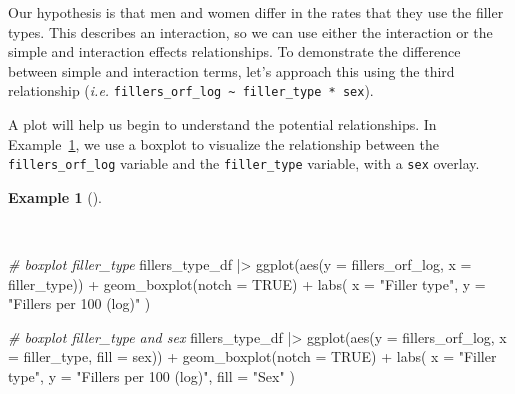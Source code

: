 \documentclass[
  letterpaper,
  krantz1]{latex/krantz-mod}
\newenvironment{Shaded}{\begin{snugshade}}{\end{snugshade}}
\newcommand{\AttributeTok}[1]{\textcolor[rgb]{0.00,0.00,0.00}{#1}}
\newcommand{\CommentTok}[1]{\textcolor[rgb]{0.00,0.00,0.00}{\textit{#1}}}
\newcommand{\ConstantTok}[1]{\textcolor[rgb]{0.00,0.00,0.00}{#1}}
\newcommand{\FunctionTok}[1]{\textcolor[rgb]{0.00,0.00,0.00}{#1}}
\newcommand{\NormalTok}[1]{\textcolor[rgb]{0.00,0.00,0.00}{#1}}
\newcommand{\SpecialCharTok}[1]{\textcolor[rgb]{0.00,0.00,0.00}{#1}}
\newcommand{\StringTok}[1]{\textcolor[rgb]{0.00,0.00,0.00}{#1}}
\theoremstyle{definition}
\theoremstyle{definition}
\newtheorem{example}{Example}[chapter]
\theoremstyle{remark}
\begin{document}
Our hypothesis is that men and women differ in the
rates that they use the filler types. This describes an
interaction, so we can use either the
interaction or the simple and interaction effects relationships. To
demonstrate the difference between simple and interaction terms, let's
approach this using the third relationship (\emph{i.e.}
\texttt{fillers\_orf\_log\ \textasciitilde{}\ filler\_type\ *\ sex}).

A plot will help us begin to understand the potential relationships. In
Example~\ref{exm-infer-multi-sex-plot}, we use a boxplot
to visualize the relationship between the \texttt{fillers\_orf\_log}
variable and the \texttt{filler\_type} variable, with a \texttt{sex}
overlay.

\begin{example}[]\protect\hypertarget{exm-infer-multi-sex-plot}{}\label{exm-infer-multi-sex-plot}

~

\begin{Shaded}
\begin{Highlighting}[numbers=left,,]
\CommentTok{\# boxplot \textasciigrave{}filler\_type\textasciigrave{}}
\NormalTok{fillers\_type\_df }\SpecialCharTok{|\textgreater{}}
  \FunctionTok{ggplot}\NormalTok{(}\FunctionTok{aes}\NormalTok{(}\AttributeTok{y =}\NormalTok{ fillers\_orf\_log, }\AttributeTok{x =}\NormalTok{ filler\_type)) }\SpecialCharTok{+}
  \FunctionTok{geom\_boxplot}\NormalTok{(}\AttributeTok{notch =} \ConstantTok{TRUE}\NormalTok{) }\SpecialCharTok{+}
  \FunctionTok{labs}\NormalTok{(}
    \AttributeTok{x =} \StringTok{"Filler type"}\NormalTok{,}
    \AttributeTok{y =} \StringTok{"Fillers per 100 (log)"}
\NormalTok{  )}

\CommentTok{\# boxplot \textasciigrave{}filler\_type\textasciigrave{} and \textasciigrave{}sex\textasciigrave{}}
\NormalTok{fillers\_type\_df }\SpecialCharTok{|\textgreater{}}
  \FunctionTok{ggplot}\NormalTok{(}\FunctionTok{aes}\NormalTok{(}\AttributeTok{y =}\NormalTok{ fillers\_orf\_log, }\AttributeTok{x =}\NormalTok{ filler\_type, }\AttributeTok{fill =}\NormalTok{ sex)) }\SpecialCharTok{+}
  \FunctionTok{geom\_boxplot}\NormalTok{(}\AttributeTok{notch =} \ConstantTok{TRUE}\NormalTok{) }\SpecialCharTok{+}
  \FunctionTok{labs}\NormalTok{(}
    \AttributeTok{x =} \StringTok{"Filler type"}\NormalTok{,}
    \AttributeTok{y =} \StringTok{"Fillers per 100 (log)"}\NormalTok{,}
    \AttributeTok{fill =} \StringTok{"Sex"}
\NormalTok{  )}
\end{Highlighting}
\end{Shaded}


\end{example}
\end{document}
